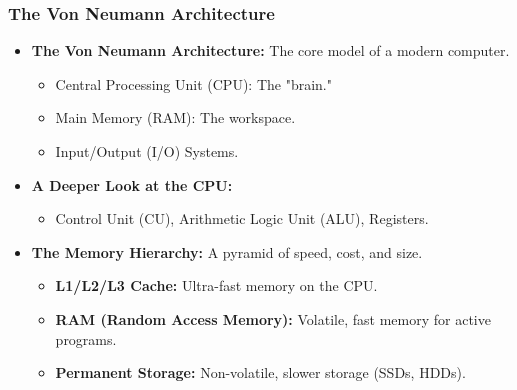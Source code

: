 \begin{frame}  
    \frametitle{The Von Neumann Architecture}
\begin{itemize}
    \item \textbf{The Von Neumann Architecture:} The core model of a modern computer.
    \begin{itemize}
        \item Central Processing Unit (CPU): The "brain."
        \item Main Memory (RAM): The workspace.
        \item Input/Output (I/O) Systems.
    \end{itemize}
    \item \textbf{A Deeper Look at the CPU:}
    \begin{itemize}
        \item Control Unit (CU), Arithmetic Logic Unit (ALU), Registers.
    \end{itemize}
    \item \textbf{The Memory Hierarchy:} A pyramid of speed, cost, and size.
    \begin{itemize}
        \item \textbf{L1/L2/L3 Cache:} Ultra-fast memory on the CPU.
        \item \textbf{RAM (Random Access Memory):} Volatile, fast memory for active programs.
        \item \textbf{Permanent Storage:} Non-volatile, slower storage (SSDs, HDDs).
    \end{itemize}
\end{itemize}
\end{frame}

